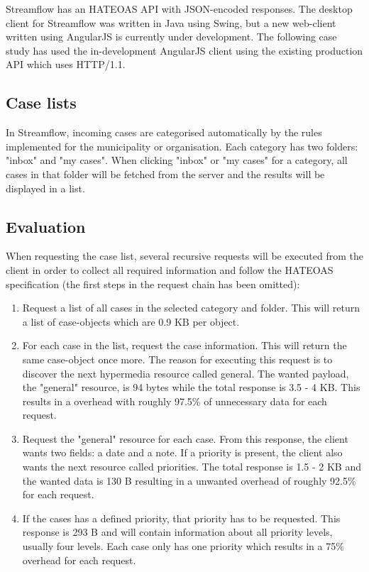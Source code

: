 \documentclass{cslthse-msc}
\begin{document}
Streamflow has an HATEOAS API with JSON-encoded responses. The desktop client for Streamflow was written in Java using Swing, but a new web-client written using AngularJS is currently under development. The following case study has used the in-development AngularJS client using the existing production API which uses HTTP/1.1.

\subsection{Case lists}
In Streamflow, incoming cases are categorised automatically by the rules implemented for the municipality or organisation. Each category has two folders: "inbox" and "my cases". When clicking "inbox" or "my cases" for a category, all cases in that folder will be fetched from the server and the results will be displayed in a list.

\subsection{Evaluation}
When requesting the case list, several recursive requests will be executed from the client in order to collect all required information and follow the HATEOAS specification (the first steps in the request chain has been omitted):

\begin{enumerate}
	\item Request a list of all cases in the selected category and folder. This will return a list of case-objects which are 0.9 KB per object.
	\item For each case in the list, request the case information. This will return the same case-object once more. The reason for executing this request is to discover the next hypermedia resource called general. The wanted payload, the "general" resource, is 94 bytes while the total response is 3.5 - 4 KB. This results in a overhead with roughly 97.5\% of unnecessary data for each request.
	\item Request the "general" resource for each case. From this response, the client wants two fields: a date and a note. If a priority is present, the client also wants the next resource called priorities. The total response is 1.5 - 2 KB and the wanted data is 130 B resulting in a unwanted overhead of roughly 92.5\% for each request.
	\item If the cases has a defined priority, that priority has to be requested. This response is 293 B and will contain information about all priority levels, usually four levels. Each case only has one priority which results in a 75\% overhead for each request.
\end{enumerate}
\end{document}
